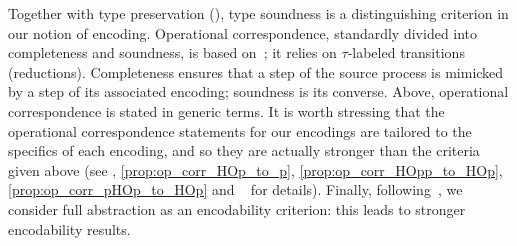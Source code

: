 \documentclass[runningheads]{llncs}
\begin{document}
{%
Together with type preservation (), type soundness is a distinguishing criterion in our notion of encoding.
Operational correspondence, standardly divided into completeness and soundness, is based
on~\cite{DBLP:journals/iandc/Gorla10,DBLP:conf/icalp/LanesePSS10};
it relies on 
$\tau$-labeled transitions (reductions).
Completeness ensures that a step of the source process is mimicked
by a step of its associated encoding; soundness is its converse.
{Above, operational correspondence is stated in generic terms.}
It is worth stressing that 
the operational correspondence statements 
for our encodings 
 are tailored to the specifics of each encoding, and so they
 are actually stronger than the criteria given above
 {(see , \ref{prop:op_corr_HOp_to_p}, \ref{prop:op_corr_HOpp_to_HOp}, \ref{prop:op_corr_pHOp_to_HOp}
 and ~\cite{KouzapasPY15} for details).}
Finally, following~\cite{SangiorgiD:expmpa,DBLP:conf/lics/PalamidessiSVV06,Yoshida96},
we consider full abstraction as an encodability criterion: this leads to 
stronger encodability results. 

%
%

}
\end{document}
